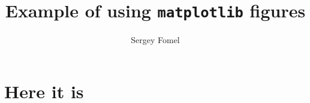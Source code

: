 \author{Sergey Fomel}
\title{Example of using \texttt{matplotlib} figures}

\maketitle

\section{Here it is}



